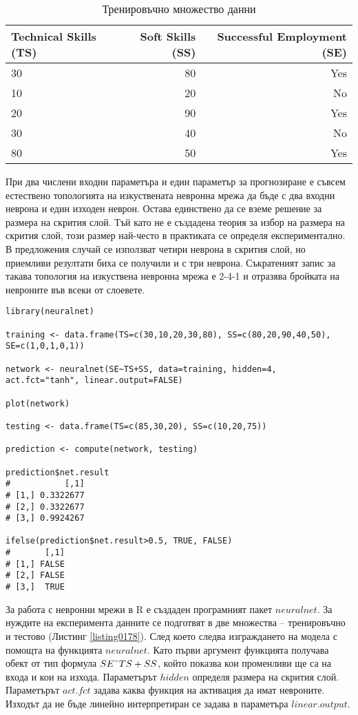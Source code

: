\begin{table}[h!]
\centering
\begin{tabular}{|l|r|r|} 
	\rowcolor{lightgray}
	\hline
	Technical Skills (TS) & Soft Skills (SS) & Successful Employment (SE) \\
	\hline\hline
	30 & 80 & Yes \\
	\hline
	10 & 20 & No \\
	\hline
	20 & 90 & Yes \\
	\hline
	30 & 40 & No \\
	\hline
	80 & 50 & Yes \\
	\hline
\end{tabular}
\caption{Тренировъчно множество данни}
\label{table0007}
\end{table}

При два числени входни параметъра и един параметър за прогнозиране е съвсем естествено топологията на изкуствената невронна мрежа да бъде с два входни неврона и един изходен неврон. Остава единствено да се вземе решение за размера на скрития слой. Тъй като не е създадена теория за избор на размера на скрития слой, този размер най-често в практиката се определя експериментално. В предложения случай се използват четири неврона в скрития слой, но приемливи резултати биха се получили и с три неврона. Съкратеният запис за такава топология на изкуствена невронна мрежа е 2-4-1 и отразява бройката на невроните във всеки от слоевете. 

\begin{lstlisting}[caption=Класифициране с изкуствена невронна мрежа, label=listing0178]
library(neuralnet)

training <- data.frame(TS=c(30,10,20,30,80), SS=c(80,20,90,40,50), SE=c(1,0,1,0,1))

network <- neuralnet(SE~TS+SS, data=training, hidden=4, act.fct="tanh", linear.output=FALSE)

plot(network)

testing <- data.frame(TS=c(85,30,20), SS=c(10,20,75))

prediction <- compute(network, testing)

prediction$net.result
#           [,1]
# [1,] 0.3322677
# [2,] 0.3322677
# [3,] 0.9924267

ifelse(prediction$net.result>0.5, TRUE, FALSE)
#       [,1]
# [1,] FALSE
# [2,] FALSE
# [3,]  TRUE
\end{lstlisting}

За работа с невронни мрежи в R е създаден програмният пакет $neuralnet$. За нуждите на експеримента данните се подготвят в две множества – тренировъчно и тестово (Листинг \ref{listing0178}). След което следва изграждането на модела с помощта на функцията $neuralnet$. Като първи аргумент функцията получава обект от тип формула $SE\char`\~TS+SS$, който показва кои променливи ще са на входа и кои на изхода. Параметърът $hidden$ определя размера на скрития слой. Параметърът $act.fct$ задава каква функция на активация да имат невроните. Изходът да не бъде линейно интерпретиран се задава в параметъра $linear.output$.


